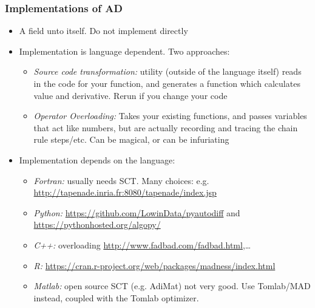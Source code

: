 \documentclass[nofootline]{etk-presentation}
\begin{document}
\begin{frame}[fragile]	\frametitle{Implementations of AD}
	\begin{itemize}
		\item A field unto itself.  Do not implement directly
		\item Implementation is language dependent.  Two approaches:
		\begin{itemize}
			\item \textit{Source code transformation:} utility (outside of the language itself) reads in the code for your function, and generates a function which calculates value and derivative.  Rerun if you change your code
			\item \textit{Operator Overloading:} Takes your existing functions, and passes variables that act like numbers, but are actually recording and tracing the chain rule steps/etc.  Can be magical, or can be infuriating
		\end{itemize}
		\item Implementation depends on the language:
		\begin{itemize}
			\item \textit{Fortran:} usually needs SCT.  Many choices: e.g. \url{http://tapenade.inria.fr:8080/tapenade/index.jsp}
			\item \textit{Python:} \url{https://github.com/LowinData/pyautodiff} and \url{https://pythonhosted.org/algopy/}
			\item \textit{C++:} overloading \url{http://www.fadbad.com/fadbad.html},\ldots
			\item \textit{R:} \url{https://cran.r-project.org/web/packages/madness/index.html}
			\item \textit{Matlab:} open source SCT (e.g. AdiMat) not very good.  Use Tomlab/MAD instead, coupled with the Tomlab optimizer.
		\end{itemize}
	\end{itemize}
\end{frame}

	\begin{frame}\frametitle{}
	\bigskip
	\bigskip
	\bigskip	
	\begin{center}
		{\huge {}}
	\end{center}
\end{frame}
\end{document}
